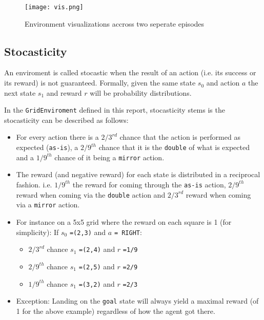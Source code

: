 \documentclass{article} %
\begin{document}
\begin{figure}[h]
    \begin{center}
        \texttt{[image: vis.png]}
    \end{center}
    \caption{Environment visualizations accross two seperate episodes}
\end{figure}



\subsection{Stocasticity}
An enviroment is called stocastic when the result of an action (i.e. its success or its 
reward) is not guaranteed. Formally, given the same state $s_0$ and action $a$ the next state
$s_1$ and reward $r$ will be probability distributions.

In the \verb|GridEnviroment| defined in this report, stocasticity stems is the stocasticity
can be described as follows:
\begin{itemize}
    \item For every action there is a $2/3^{rd}$ chance that the action is performed as
        expected (\verb|as-is|), a $2/9^{th}$ chance that it is the \verb|double| of what 
        is expected and a $1/9^{th}$ chance of it being a \verb|mirror| action.
    \item The reward (and negative reward) for each state is distributed in a reciprocal
        fashion. i.e. $1/9^{th}$ the reward for coming through the \verb|as-is| action,
        $2/9^{th}$ reward when coming via the \verb|double| action and $2/3^{rd}$ reward when
        coming via a \verb|mirror| action.
    \item For instance on a 5x5 grid where the reward on each square is 1 (for simplicity):
    \newline
    If $s_0$ \verb|=(2,3)| and $a$ \verb|= RIGHT|:
        \begin{itemize}
            \item $2/3^{rd}$ chance $s_1$ \verb|=(2,4)| and $r$ \verb|=1/9|
            \item $2/9^{th}$ chance $s_1$ \verb|=(2,5)| and $r$ \verb|=2/9|
            \item $1/9^{th}$ chance $s_1$ \verb|=(3,2)| and $r$ \verb|=2/3|
        \end{itemize}
    \item Exception: Landing on the \verb|goal| state will always yield a maximal reward
        (of 1 for the above example) regardless of how the agent got there.
\end{itemize}
\end{document}
